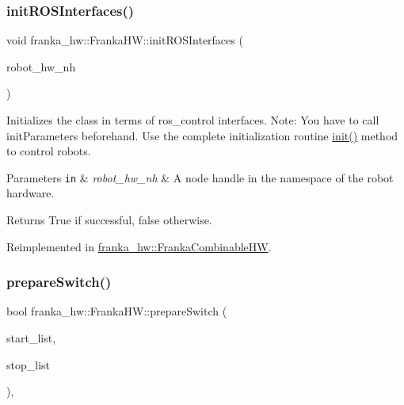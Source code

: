 \subsubsection{\texorpdfstring{init\+R\+O\+S\+Interfaces()}{initROSInterfaces()}}
{\footnotesize\ttfamily void franka\+\_\+hw\+::\+Franka\+H\+W\+::init\+R\+O\+S\+Interfaces (\begin{DoxyParamCaption}\item[{ros\+::\+Node\+Handle \&}]{robot\+\_\+hw\+\_\+nh }\end{DoxyParamCaption})\hspace{0.3cm}{\ttfamily [virtual]}}

Initializes the class in terms of ros\+\_\+control interfaces. Note\+: You have to call init\+Parameters beforehand. Use the complete initialization routine \hyperlink{classfranka__hw_1_1_franka_h_w_a0323c9d759de8d6ab8fae4bf574e4a48}{init()} method to control robots.


\begin{DoxyParams}[1]{Parameters}
\mbox{\tt in}  & {\em robot\+\_\+hw\+\_\+nh} & A node handle in the namespace of the robot hardware. \\
\hline
\end{DoxyParams}
\begin{DoxyReturn}{Returns}
True if successful, false otherwise. 
\end{DoxyReturn}


Reimplemented in \hyperlink{classfranka__hw_1_1_franka_combinable_h_w_a1e89406fc542ad7fb45ff0c1402c61c3}{franka\+\_\+hw\+::\+Franka\+Combinable\+HW}.

\mbox{\label{classfranka__hw_1_1_franka_h_w_ab73b14d5f8481cd3cb3d670aeae2de06}} 
\subsubsection{\texorpdfstring{prepare\+Switch()}{prepareSwitch()}}
{\footnotesize\ttfamily bool franka\+\_\+hw\+::\+Franka\+H\+W\+::prepare\+Switch (\begin{DoxyParamCaption}\item[{const std\+::list$<$ hardware\+\_\+interface\+::\+Controller\+Info $>$ \&}]{start\+\_\+list,  }\item[{const std\+::list$<$ hardware\+\_\+interface\+::\+Controller\+Info $>$ \&}]{stop\+\_\+list }\end{DoxyParamCaption})\hspace{0.3cm}{\ttfamily [override]}, {\ttfamily [virtual]}}

